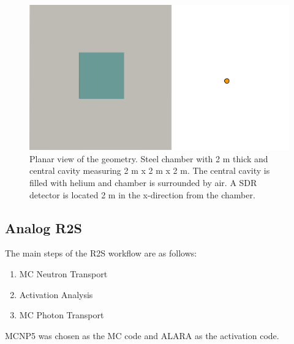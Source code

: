 \begin{figure}
	\centering
	\includegraphics[scale=0.7]{figs/orig_geom.png}
	\caption[Experimental Geometry] 
	{Planar view of the geometry.  Steel
	chamber with 2 m thick and central cavity measuring 2 m x 2 m x 2 m.
	The central cavity is filled with helium and chamber is surrounded by air.
	A SDR detector is located 2 m in the x-direction from the chamber.\label{fig:ex.geom}}
\end{figure}

\subsection{Analog R2S}\label{sec:analog}
The main steps of the R2S workflow are as follows:
\begin{enumerate}
	\item MC Neutron Transport
	\item Activation Analysis
	\item MC Photon Transport
\end{enumerate}
MCNP5 \cite{mcnp_manual} was chosen as the MC code and ALARA \cite{alara} as the activation code.  

